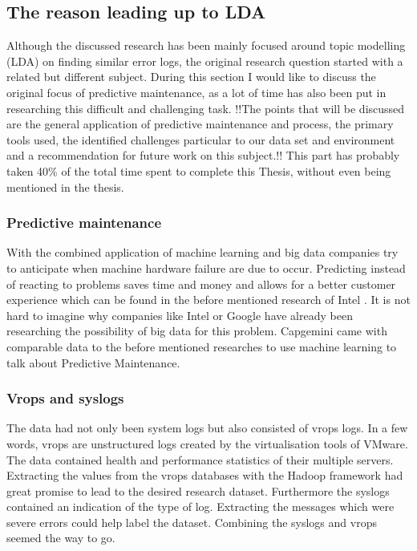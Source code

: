 \subsection{The reason leading up to LDA}\label{conclusion:discussion}
Although the discussed research has been mainly focused around topic modelling (LDA) on finding similar error logs, the original research question started with a related but different subject. During this section I would like to discuss the original focus of predictive maintenance, as a lot of time has also been put in researching this difficult and challenging task. !!The points that will be discussed are the general application of predictive maintenance and process, the primary tools used, the identified challenges particular to our data set and environment and a recommendation for future work on this subject.!! This part has probably taken 40\% of the total time spent to complete this Thesis, without even being mentioned in the thesis.

\subsubsection{Predictive maintenance}
With the combined application of machine learning and big data companies try to anticipate when machine hardware failure are due to occur. Predicting instead of reacting to problems saves time and money and allows for a better customer experience which can be found in the before mentioned research of Intel \cite{Sipos2014Log-basedMaintenance}\cite{AjayChandramoulyRavindraNarkhedeVijayMungaraGuillermoRueda2013ReducingAnalytics}. It is not hard to imagine why companies like Intel  or Google have already been researching the possibility of big data for this problem. Capgemini came with comparable data to the before mentioned researches to use machine learning to talk about Predictive Maintenance.

\subsubsection{Vrops and syslogs}
The data had not only been system logs but also consisted of vrops logs. In a few words, vrops are unstructured logs created by the virtualisation tools of VMware. The data contained health and performance statistics of their multiple servers. Extracting the values from the vrops databases with the Hadoop framework had great promise to lead to the desired research dataset. Furthermore the syslogs contained an indication of the type of log. Extracting the messages which were severe errors could help label the dataset. Combining the syslogs and vrops seemed the way to go. 

